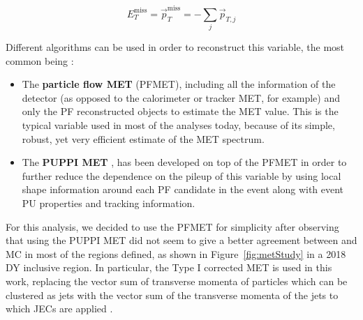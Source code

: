 \documentclass[a4paper, 10pt, openright]{report}
\begin{document}
\begin{equation}
\label{eq:MET}
E_{T}^{\text{miss}} = \overrightarrow{p}_T^{\text{miss}} = - \sum_j \overrightarrow{p}_{T, j}
\end{equation}

Different algorithms can be used in order to reconstruct this variable, the most common being \cite{METReco}:
\begin{itemize}
\item The \textbf{particle flow \ac{MET}} (PFMET), including all the information of the detector (as opposed to the calorimeter or tracker \ac{MET}, for example) and only the \ac{PF} reconstructed objects to estimate the \ac{MET} value. This is the typical variable used in most of the analyses today, because of its simple, robust, yet very efficient estimate of the \ac{MET} spectrum.
\item The \textbf{\ac{PUPPI} \ac{MET}} \cite{PUPPI}, has been developed on top of the PFMET in order to further reduce the dependence on the pileup of this variable by using local shape information around each \ac{PF} candidate in the event along with event \ac{PU} properties and tracking information. %
\end{itemize}

For this analysis, we decided to use the PFMET for simplicity after observing that using the \ac{PUPPI} \ac{MET} did not seem to give a better agreement between and \ac{MC} in most of the regions defined, as shown in Figure~\ref{fig:metStudy} in a 2018 \ac{DY} inclusive region. In particular, the Type I corrected \ac{MET} is used in this work, replacing the vector sum of transverse momenta of particles which can be clustered as jets with the vector sum of the transverse momenta of the jets to which \acp{JEC} are applied \cite{METTwiki}.
\end{document}
